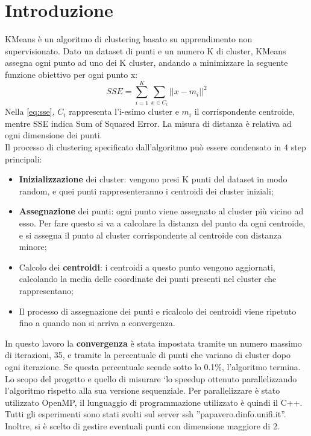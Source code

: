 \documentclass[10pt,twocolumn,letterpaper]{article}
\newcommand{\bit} {\begin{itemize} }
\newcommand{\eit} {\end{itemize} }
\begin{document}
\section{Introduzione}
\label{sec:intro}
KMeans è un algoritmo di clustering basato su apprendimento non supervisionato. Dato un dataset di punti e un numero K di cluster, KMeans assegna ogni punto ad uno dei K cluster, andando a minimizzare la seguente funzione obiettivo per ogni punto x:
\begin{equation}
    \label{eq:sse}
    SSE = \sum_{i = 1}^K \sum_{x \in C_i} \lvert \lvert x - m_i \rvert \rvert^2
\end{equation}
Nella \cref{eq:sse}, $C_i$ rappresenta l'i-esimo cluster e $m_i$ il corrispondente centroide, mentre SSE indica Sum of Squared Error. La misura di distanza è relativa ad ogni dimensione dei punti.\\
Il processo di clustering specificato dall'algoritmo può essere condensato in 4 step principali:
\bit
    \item{\textbf{Inizializzazione} dei cluster: vengono presi K punti del dataset in modo random, e quei punti rappresenteranno i centroidi dei cluster iniziali;}
    \item{\textbf{Assegnazione} dei punti: ogni punto viene assegnato al cluster più vicino ad esso. Per fare questo si va a calcolare la distanza del punto da ogni centroide, e si assegna il punto al cluster corrispondente al centroide con distanza minore;}
    \item{Calcolo dei \textbf{centroidi}: i centroidi a questo punto vengono aggiornati, calcolando la media delle coordinate dei punti presenti nel cluster che rappresentano;}
    \item{Il processo di assegnazione dei punti e ricalcolo dei centroidi viene ripetuto fino a quando non si arriva a convergenza.\\}
\eit
In questo lavoro la \textbf{convergenza} è stata impostata tramite un numero massimo di iterazioni, 35, e tramite la percentuale di punti che variano di cluster dopo ogni iterazione. Se questa percentuale scende sotto lo 0.1\%, l'algoritmo termina.\\
Lo scopo del progetto e quello di misurare `lo speedup ottenuto parallelizzando l’algoritmo rispetto alla sua versione sequenziale. Per parallelizzare è stato utilizzato OpenMP, il lunguaggio di programmazione utilizzato è quindi il C++.\\
Tutti gli esperimenti sono stati svolti sul server ssh ”papavero.dinfo.unifi.it”.\\
Inoltre, si è scelto di gestire eventuali punti con dimensione maggiore di 2.
\end{document}
